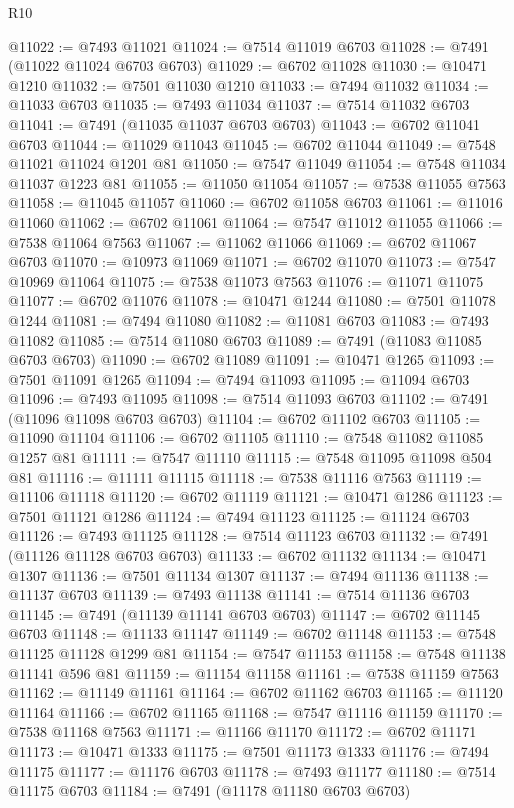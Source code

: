 \begin{lexlean}{R10}
\begin{coremodule}
{{{{{{{{{{{{{{{{{{{{{{{{{{{{{{{{{{{{{{{{{{{{{{{{{{{{{{{{{{{{{{{{{{{{{{{{{{{{{{{{{{{{@11022 := @7493 @11021
@11024 := @7514 @11019 @6703
@11028 := @7491 (@11022 @11024 @6703 @6703)
@11029 := @6702 @11028
@11030 := @10471 @1210
@11032 := @7501 @11030 @1210
@11033 := @7494 @11032
@11034 := @11033 @6703
@11035 := @7493 @11034
@11037 := @7514 @11032 @6703
@11041 := @7491 (@11035 @11037 @6703 @6703)
@11043 := @6702 @11041 @6703
@11044 := @11029 @11043
@11045 := @6702 @11044
@11049 := @7548 @11021 @11024 @1201 @81
@11050 := @7547 @11049
@11054 := @7548 @11034 @11037 @1223 @81
@11055 := @11050 @11054
@11057 := @7538 @11055 @7563
@11058 := @11045 @11057
@11060 := @6702 @11058 @6703
@11061 := @11016 @11060
@11062 := @6702 @11061
@11064 := @7547 @11012 @11055
@11066 := @7538 @11064 @7563
@11067 := @11062 @11066
@11069 := @6702 @11067 @6703
@11070 := @10973 @11069
@11071 := @6702 @11070
@11073 := @7547 @10969 @11064
@11075 := @7538 @11073 @7563
@11076 := @11071 @11075
@11077 := @6702 @11076
@11078 := @10471 @1244
@11080 := @7501 @11078 @1244
@11081 := @7494 @11080
@11082 := @11081 @6703
@11083 := @7493 @11082
@11085 := @7514 @11080 @6703
@11089 := @7491 (@11083 @11085 @6703 @6703)
@11090 := @6702 @11089
@11091 := @10471 @1265
@11093 := @7501 @11091 @1265
@11094 := @7494 @11093
@11095 := @11094 @6703
@11096 := @7493 @11095
@11098 := @7514 @11093 @6703
@11102 := @7491 (@11096 @11098 @6703 @6703)
@11104 := @6702 @11102 @6703
@11105 := @11090 @11104
@11106 := @6702 @11105
@11110 := @7548 @11082 @11085 @1257 @81
@11111 := @7547 @11110
@11115 := @7548 @11095 @11098 @504 @81
@11116 := @11111 @11115
@11118 := @7538 @11116 @7563
@11119 := @11106 @11118
@11120 := @6702 @11119
@11121 := @10471 @1286
@11123 := @7501 @11121 @1286
@11124 := @7494 @11123
@11125 := @11124 @6703
@11126 := @7493 @11125
@11128 := @7514 @11123 @6703
@11132 := @7491 (@11126 @11128 @6703 @6703)
@11133 := @6702 @11132
@11134 := @10471 @1307
@11136 := @7501 @11134 @1307
@11137 := @7494 @11136
@11138 := @11137 @6703
@11139 := @7493 @11138
@11141 := @7514 @11136 @6703
@11145 := @7491 (@11139 @11141 @6703 @6703)
@11147 := @6702 @11145 @6703
@11148 := @11133 @11147
@11149 := @6702 @11148
@11153 := @7548 @11125 @11128 @1299 @81
@11154 := @7547 @11153
@11158 := @7548 @11138 @11141 @596 @81
@11159 := @11154 @11158
@11161 := @7538 @11159 @7563
@11162 := @11149 @11161
@11164 := @6702 @11162 @6703
@11165 := @11120 @11164
@11166 := @6702 @11165
@11168 := @7547 @11116 @11159
@11170 := @7538 @11168 @7563
@11171 := @11166 @11170
@11172 := @6702 @11171
@11173 := @10471 @1333
@11175 := @7501 @11173 @1333
@11176 := @7494 @11175
@11177 := @11176 @6703
@11178 := @7493 @11177
@11180 := @7514 @11175 @6703
@11184 := @7491 (@11178 @11180 @6703 @6703)
}}}}}}}}}}}}}}}}}}}}}}}}}}}}}}}}}}}}}}}}}}}}}}}}}}}}}}}}}}}}}}}}}}}}}}}}}}}}}}}}}}}}
\end{coremodule}
\end{lexlean}
